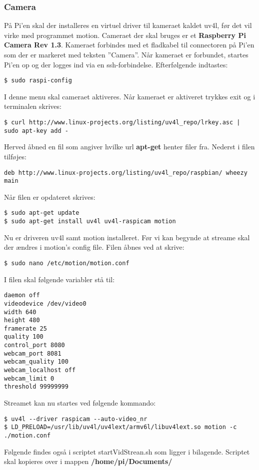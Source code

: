 \subsubsection{Camera}
På Pi'en skal der installeres en virtuel driver til kameraet kaldet uv4l, før det vil virke med programmet motion. Cameraet der skal bruges er et \textbf{Raspberry Pi Camera Rev 1.3}. Kameraet forbindes med et fladkabel til connectoren på Pi'en som der er markeret med teksten ''Camera''. Når kameraet er forbundet, startes Pi'en op og der logges ind via en ssh-forbindelse. Efterfølgende indtastes: 
\begin{lstlisting}
$ sudo raspi-config
\end{lstlisting}
I denne menu skal cameraet aktiveres. Når kameraet er aktiveret trykkes exit og i terminalen skrives:
\begin{lstlisting}
$ curl http://www.linux-projects.org/listing/uv4l_repo/lrkey.asc | sudo apt-key add -
\end{lstlisting}
Herved åbned en fil som angiver hvilke url \textbf{apt-get} henter filer fra. Nederst i filen tilføjes:
\begin{lstlisting}
deb http://www.linux-projects.org/listing/uv4l_repo/raspbian/ wheezy main
\end{lstlisting}
Når filen er opdateret skrives:
\begin{lstlisting}
$ sudo apt-get update
$ sudo apt-get install uv4l uv4l-raspicam motion
\end{lstlisting}
Nu er driveren uv4l samt motion installeret. Før vi kan begynde at streame skal der ændres i motion's config file.  Filen åbnes ved at skrive:
\begin{lstlisting}
$ sudo nano /etc/motion/motion.conf
\end{lstlisting}
I filen skal følgende variabler stå til:
\begin{lstlisting}
daemon off
videodevice /dev/video0
width 640
height 480
framerate 25
quality 100
control_port 8080
webcam_port 8081
webcam_quality 100
webcam_localhost off
webcam_limit 0
threshold 99999999
\end{lstlisting}
Streamet kan nu startes ved følgende kommando:
\begin{lstlisting}
$ uv4l --driver raspicam --auto-video_nr
$ LD_PRELOAD=/usr/lib/uv4l/uv4lext/armv6l/libuv4lext.so motion -c ./motion.conf
\end{lstlisting}
Følgende findes også i scriptet startVidStrean.sh som ligger i bilagende. Scriptet skal kopieres over i mappen \textbf{/home/pi/Documents/}
